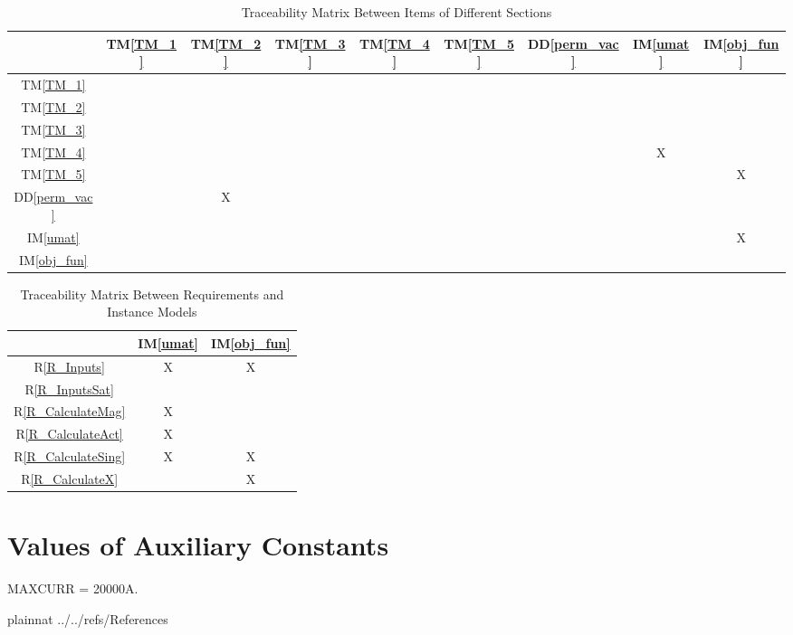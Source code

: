 \documentclass[12pt]{article}
\newcommand{\ddref}[1]{DD\ref{#1}}
\newcommand{\tref}[1]{TM\ref{#1}}
\newcommand{\iref}[1]{IM\ref{#1}}
\newcommand{\rref}[1]{R\ref{#1}}
\begin{document}
\begin{table}[h!]
\centering
\begin{tabular}{|c|c|c|c|c|c|c|c|c|}
\hline        
	& \tref{TM_1}& \tref{TM_2}& \tref{TM_3}& \tref{TM_4}& \tref{TM_5} & \ddref{perm_vac}& \iref{umat} & \iref{obj_fun} \\
\hline
\tref{TM_1}     & & & & & & & &  \\ \hline
\tref{TM_2}     & & & & & & & &  \\ \hline
\tref{TM_3}     & & & & & & & &  \\ \hline
\tref{TM_4}     & & & & & & &X &  \\ \hline
\tref{TM_5}      & & & & & & & &X  \\ \hline
\ddref{perm_vac} & &X & & & & & &  \\ \hline
\iref{umat}  & & & & & & & &X  \\ \hline
\iref{obj_fun}    & & & & & & & &  \\ 
\hline
\end{tabular}
\caption{Traceability Matrix Between Items of Different Sections}
\label{Table:trace}
\end{table}

\begin{table}[h!]
\centering
\begin{tabular}{|c|c|c|}
\hline
	& \iref{umat}& \iref{obj_fun} \\
\hline
\rref{R_Inputs}     &X &X \\ \hline
\rref{R_InputsSat}    & & \\ \hline
\rref{R_CalculateMag}   &X & \\ \hline
\rref{R_CalculateAct}     &X & \\ \hline 
\rref{R_CalculateSing}       &X &X \\ \hline
\rref{R_CalculateX}   & &X \\ 
\hline
\end{tabular}
\caption{Traceability Matrix Between Requirements and Instance Models}
\label{Table:R_trace}
\end{table}

\newpage

\section{Values of Auxiliary Constants}
MAXCURR = 20000A.

\newpage

 {plainnat}
 {../../refs/References}
\end{document}
